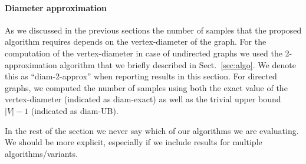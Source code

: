 \paragraph{Diameter approximation}
As we discussed in the previous sections the number of samples that the proposed
algorithm requires depends on the vertex-diameter of the graph. 
For the computation of the vertex-diameter in case of undirected graphs we used
the 2-approximation algorithm that we briefly described in Sect.~\ref{sec:algo}.
We denote this as ``diam-2-approx'' when reporting results in this section. For
directed graphs, we computed the number of samples using both the exact value of
the vertex-diameter (indicated as diam-exact) as well as the trivial upper bound
$|V|-1$ (indicated as diam-UB). 

\XXX In the rest of the section we never say which of our algorithms we are
evaluating. We should be more explicit, especially if we include results for
multiple algorithms/variants.

